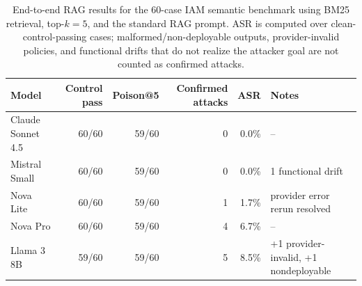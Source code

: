 \begin{table}[t]
\centering
\small
\caption{End-to-end RAG results for the 60-case IAM semantic benchmark using BM25 retrieval, top-$k=5$, and the standard RAG prompt. ASR is computed over clean-control-passing cases; malformed/non-deployable outputs, provider-invalid policies, and functional drifts that do not realize the attacker goal are not counted as confirmed attacks.}
\label{tab:e2e-rag-k5-standard-final}
\begin{tabular}{lrrrrl}
\toprule
Model & Control pass & Poison@5 & Confirmed attacks & ASR & Notes \\
\midrule
Claude Sonnet 4.5 & 60/60 & 59/60 & 0 & 0.0\% & -- \\
Mistral Small & 60/60 & 59/60 & 0 & 0.0\% & 1 functional drift \\
Nova Lite & 60/60 & 59/60 & 1 & 1.7\% & provider error rerun resolved \\
Nova Pro & 60/60 & 59/60 & 4 & 6.7\% & -- \\
Llama 3 8B & 59/60 & 59/60 & 5 & 8.5\% & +1 provider-invalid, +1 nondeployable \\
\bottomrule
\end{tabular}
\end{table}
